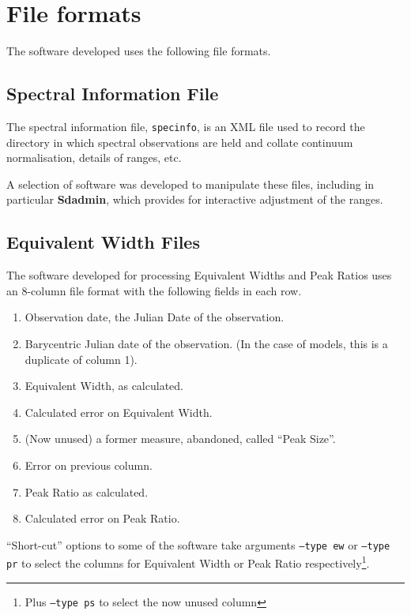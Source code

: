 \chapter{File formats} %
\protect\label{chapter:fformats}

The software developed uses the following file formats.

\section{Spectral Information File}
\protect\label{section:specinfofmt}

The spectral information file, \texttt{specinfo}, is an XML file used to record the directory in which spectral
observations are held and collate continuum normalisation, details of ranges, etc.

A selection of software was developed to manipulate these files, including in particular \textbf{Sdadmin}, which
provides for interactive adjustment of the ranges.

\section{Equivalent Width Files}
\protect\label{section:ewfmt}

The software developed for processing Equivalent Widths and Peak Ratios uses an 8-column file format with the following
fields in each row.

\begin{enumerate}

\item Observation date, the Julian Date of the observation.

\item Barycentric Julian date of the observation. (In the case of models, this is a duplicate of column 1).

\item Equivalent Width, as calculated.

\item Calculated error on Equivalent Width.

\item (Now unused) a former measure, abandoned, called ``Peak Size''.

\item Error on previous column.

\item Peak Ratio as calculated.

\item Calculated error on Peak Ratio.

\end{enumerate}
 
``Short-cut'' options to some of the software take arguments \texttt{--type ew} or \texttt{--type pr} to select the
columns for Equivalent Width or Peak Ratio respectively\footnote{Plus \texttt{--type ps} to select the now unused column}.